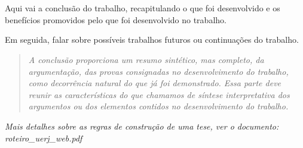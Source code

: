 \chapter*{}
\noindent
{}
\vspace{1cm}

Aqui vai a conclusão do trabalho, recapitulando o que foi desenvolvido e os benefícios promovidos pelo que foi desenvolvido no trabalho. 

Em seguida, falar sobre possíveis trabalhos futuros ou continuações do trabalho.

\begin{quote}
\textit{A conclusão proporciona um resumo sintético, mas completo, da argumentação,
das provas consignadas no desenvolvimento do trabalho, como decorrência
natural do que já foi demonstrado. Essa parte deve reunir as características do que
chamamos de síntese interpretativa dos argumentos ou dos elementos contidos no
desenvolvimento do trabalho.}
\end{quote}

\vspace{0.5cm}
\textit{Mais detalhes sobre as regras de construção de uma tese, ver o documento:
roteiro\_uerj\_web.pdf}